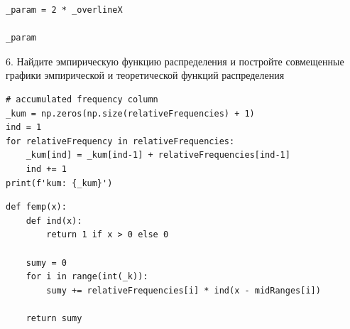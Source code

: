 \documentclass[a4paper, 14pt]{extarticle}
\begin{document}
\begin{lstlisting}
_param = 2 * _overlineX

_param
\end{lstlisting}

\begin{center}
    6. Найдите эмпирическую функцию распределения и постройте совмещенные 
    графики эмпирической и теоретической функций распределения
\end{center}

\begin{lstlisting}
# accumulated frequency column
_kum = np.zeros(np.size(relativeFrequencies) + 1)
ind = 1 
for relativeFrequency in relativeFrequencies:
    _kum[ind] = _kum[ind-1] + relativeFrequencies[ind-1]
    ind += 1
print(f'kum: {_kum}')
\end{lstlisting}

\begin{lstlisting}
def femp(x):
    def ind(x):
        return 1 if x > 0 else 0

    sumy = 0 
    for i in range(int(_k)):
        sumy += relativeFrequencies[i] * ind(x - midRanges[i])
    
    return sumy
\end{lstlisting}
\end{document}
